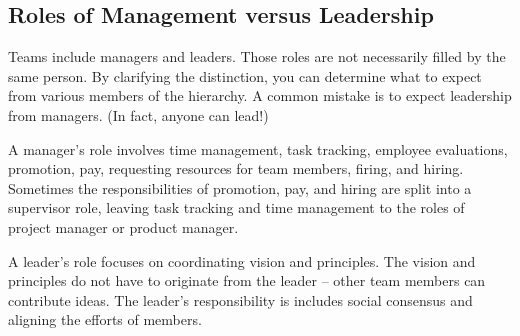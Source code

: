 

\subsection*{Roles of Management versus Leadership}

Teams include managers and leaders. Those roles are not necessarily filled by the same person. By clarifying the distinction, you can determine what to expect from various members of the hierarchy. A common mistake is to expect leadership from managers. (In fact, anyone can lead!)

A manager's role involves time management, task tracking, employee evaluations, promotion, pay, requesting resources for team members, firing, and hiring. Sometimes the responsibilities of promotion, pay, and hiring are split into a supervisor role, leaving task tracking and time management to the roles of project manager or product manager.

A leader's role focuses on coordinating vision and principles. The vision and principles do not have to originate from the leader -- other team members can contribute ideas. The leader's responsibility is includes social consensus and aligning the efforts of members. 
